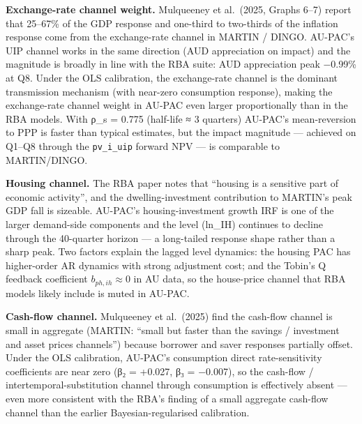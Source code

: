 \documentclass[
]{article}
\begin{document}
\textbf{Exchange-rate channel weight.} Mulqueeney et al.~(2025, Graphs
6--7) report that 25--67\% of the GDP response and one-third to
two-thirds of the inflation response come from the exchange-rate channel
in MARTIN / DINGO. AU-PAC's UIP channel works in the same direction (AUD
appreciation on impact) and the magnitude is broadly in line with the
RBA suite: AUD appreciation peak −0.99\% at Q8. Under the OLS
calibration, the exchange-rate channel is the dominant transmission
mechanism (with near-zero consumption response), making the
exchange-rate channel weight in AU-PAC even larger proportionally than
in the RBA models. With ρ\_s = 0.775 (half-life ≈ 3 quarters) AU-PAC's
mean-reversion to PPP is faster than typical estimates, but the impact
magnitude --- achieved on Q1--Q8 through the \texttt{pv\_i\_uip} forward
NPV --- is comparable to MARTIN/DINGO.

\textbf{Housing channel.} The RBA paper notes that ``housing is a
sensitive part of economic activity'', and the dwelling-investment
contribution to MARTIN's peak GDP fall is sizeable. AU-PAC's
housing-investment growth IRF is one of the larger demand-side
components and the level (ln\_IH) continues to decline through the
40-quarter horizon --- a long-tailed response shape rather than a sharp
peak. Two factors explain the lagged level dynamics: the housing PAC has
higher-order AR dynamics with strong adjustment cost; and the Tobin's Q
feedback coefficient \(b_{ph,ih} \approx 0\) in AU data, so the
house-price channel that RBA models likely include is muted in AU-PAC.

\textbf{Cash-flow channel.} Mulqueeney et al.~(2025) find the cash-flow
channel is small in aggregate (MARTIN: ``small but faster than the
savings / investment and asset prices channels'') because borrower and
saver responses partially offset. Under the OLS calibration, AU-PAC's
consumption direct rate-sensitivity coefficients are near zero (β₂ =
+0.027, β₃ = −0.007), so the cash-flow / intertemporal-substitution
channel through consumption is effectively absent --- even more
consistent with the RBA's finding of a small aggregate cash-flow channel
than the earlier Bayesian-regularised calibration.
\end{document}
